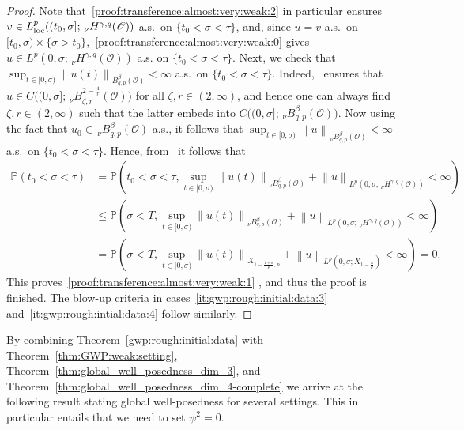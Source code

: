\documentclass[reqno]{amsart}
\renewcommand{\P}{\mathbb{P}}
\newcommand{\sO}{\mathscr{O}}
\newcommand{\1}{\mathbf{1}}
\newcommand{\loc}{\textup{loc}}
\newcommand{\nH}{\ensuremath{\,_\nu H}}
\newcommand{\bpsn}[1]{\ensuremath{\nH^{#1}(\sO)}}
\newcommand{\nrm}[1]{\left\lVert #1 \right\rVert}
\begin{document}
\begin{proof}
Note that~\eqref{proof:transference:almost:very:weak:2} in particular ensures $v\in L^p_{\loc}((t_0, \sigma]; \nH^{\gamma,q}(\sO))$ a.s.\ on $\{t_0<\sigma<\tau\}$, and, since $u=v$ a.s.\ on $[t_0,\sigma)\times\{\sigma>t_0\}$,~\eqref{proof:transference:almost:very:weak:0} gives $u\in L^p(0,\sigma;\bpsn{\gamma,q})$ a.s. on $\{t_0<\sigma<\tau\}.$
Next, we check that $\sup_{t\in [0,\sigma)} \nrm{u(t)}_{B_{q,p}^{\beta}(\sO)}<\infty$ a.s.\ on $\{t_0<\sigma<\tau\}$. 
Indeed,~\cite[Proposition 2.1]{agrestiNonlinearSPDEsMaximal2025} ensures that $u\in C\big((0,\sigma];\,_\nu B^{2-\frac{4}{r}}_{\zeta,r}(\sO)\big)$ for all $\zeta,r\in (2,\infty)$, and hence one can always find $\zeta,r \in (2,\infty)$ such that the latter embeds into $C\big((0,\sigma]; \,_\nu B^{\beta}_{q,p}(\sO)\big)$. Now using the fact that $u_0\in \,_\nu B^{\beta}_{q,p}(\sO)$ a.s., it follows that $\sup_{t\in [0,\sigma)}\nrm{u}_{\,_\nu B^{\beta}_{q,p}(\sO)} <\infty$ a.s.\ on $\{t_0<\sigma<\tau\}$.
Hence, from~\cite[Theorem 4.10 (3)]{agrestiNonlinearParabolicStochastic2022a} it follows that 
\begin{equation}
    \begin{aligned}
        \P(t_0<\sigma<\tau)&=\P(t_0<\sigma<\tau, \sup_{t\in[0,\sigma)}\nrm{u(t)}_{_\nu B_{q,p}^\beta(\sO)}+\nrm{u}_{L^p(0,\sigma;\nH^{\gamma,q}(\sO))}<\infty )\\
        &\le \P(\sigma<T, \sup_{t\in[0,\sigma)}\nrm{u(t)}_{_\nu B_{q,p}^\beta(\sO)}+\nrm{u}_{L^p(0,\sigma;\nH^{\gamma,q}(\sO))}<\infty )\\
        &=\P(\sigma<T, \sup_{t\in[0,\sigma)}\nrm{u(t)}_{X_{1-\frac{1+\kappa}{p},p}}+\nrm{u}_{L^p(0,\sigma;X_{1-\frac{\kappa}{p}})}<\infty)=0.
    \end{aligned}
\end{equation}
This proves~\eqref{proof:transference:almost:very:weak:1} , and thus the proof is finished. 
The blow-up criteria in cases~\ref{it:gwp:rough:initial:data:3} and~\ref{it:gwp:rough:intial:data:4} follow similarly. 
    \end{proof}
    By combining Theorem~\ref{gwp:rough:initial:data}
with Theorem~\ref{thm:GWP:weak:setting},  Theorem~\ref{thm:global_well_posedness_dim_3}, and Theorem~\ref{thm:global_well_posedness_dim_4-complete} we arrive at the following result stating global well-posedness for several settings. This in particular entails that we need to set $\psi^2=0$. 
\end{document}
